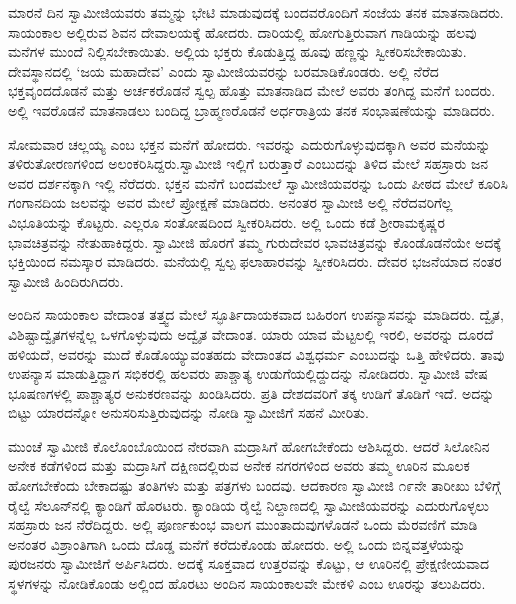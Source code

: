  ಮಾರನೆ ದಿನ ಸ್ವಾಮೀಜಿಯವರು ತಮ್ಮನ್ನು ಭೇಟಿ ಮಾಡುವುದಕ್ಕೆ ಬಂದವರೊಂದಿಗೆ ಸಂಜೆಯ ತನಕ ಮಾತನಾಡಿದರು. ಸಾಯಂಕಾಲ ಅಲ್ಲಿರುವ ಶಿವನ ದೇವಾಲಯಕ್ಕೆ ಹೋದರು. ದಾರಿಯಲ್ಲಿ ಹೋಗುತ್ತಿರುವಾಗ ಗಾಡಿಯನ್ನು ಹಲವು ಮನೆಗಳ ಮುಂದೆ ನಿಲ್ಲಿಸಬೇಕಾಯಿತು. ಅಲ್ಲಿಯ ಭಕ್ತರು ಕೊಡುತ್ತಿದ್ದ ಹೂವು ಹಣ್ಣನ್ನು ಸ್ವೀಕರಿಸಬೇಕಾಯಿತು. ದೇವಸ್ಥಾನದಲ್ಲಿ ‘ಜಯ ಮಹಾದೇವ’ ಎಂದು ಸ್ವಾಮೀಜಿಯವರನ್ನು ಬರಮಾಡಿಕೊಂಡರು. ಅಲ್ಲಿ ನೆರೆದ ಭಕ್ತವೃಂದದೊಡನೆ ಮತ್ತು ಅರ್ಚಕರೊಡನೆ ಸ್ವಲ್ಪ ಹೊತ್ತು ಮಾತನಾಡಿದ ಮೇಲೆ ಅವರು ತಂಗಿದ್ದ ಮನೆಗೆ ಬಂದರು. ಅಲ್ಲಿ ಇವರೊಡನೆ ಮಾತನಾಡಲು ಬಂದಿದ್ದ ಬ್ರಾಹ್ಮಣರೊಡನೆ ಅರ್ಧರಾತ್ರಿಯ ತನಕ ಸಂಭಾಷಣೆಯನ್ನು ಮಾಡಿದರು. 

 ಸೋಮವಾರ ಚಲ್ಲಯ್ಯ ಎಂಬ ಭಕ್ತನ ಮನೆಗೆ ಹೋದರು. ಇವರನ್ನು ಎದುರುಗೊಳ್ಳುವುದಕ್ಕಾಗಿ ಅವರ ಮನೆಯನ್ನು ತಳಿರುತೋರಣಗಳಿಂದ ಅಲಂಕರಿಸಿದ್ದರು.\break ಸ್ವಾಮೀಜಿ ಇಲ್ಲಿಗೆ ಬರುತ್ತಾರೆ ಎಂಬುದನ್ನು ತಿಳಿದ ಮೇಲೆ ಸಹಸ್ರಾರು ಜನ ಅವರ ದರ್ಶನಕ್ಕಾಗಿ ಇಲ್ಲಿ ನೆರೆದರು. ಭಕ್ತನ ಮನೆಗೆ ಬಂದಮೇಲೆ ಸ್ವಾಮೀಜಿಯವರನ್ನು ಒಂದು ಪೀಠದ ಮೇಲೆ ಕೂರಿಸಿ ಗಂಗಾನದಿಯ ಜಲವನ್ನು ಅವರ ಮೇಲೆ ಪ್ರೋಕ್ಷಣೆ ಮಾಡಿದರು. ಅನಂತರ ಸ್ವಾಮೀಜಿ ಅಲ್ಲಿ ನೆರೆದವರಿಗೆಲ್ಲ ವಿಭೂತಿಯನ್ನು ಕೊಟ್ಟರು. ಎಲ್ಲರೂ ಸಂತೋಷದಿಂದ ಸ್ವೀಕರಿಸಿದರು. ಅಲ್ಲಿ ಒಂದು ಕಡೆ ಶ‍್ರೀರಾಮಕೃಷ್ಣರ ಭಾವಚಿತ್ರವನ್ನು ನೇತುಹಾಕಿದ್ದರು. ಸ್ವಾಮೀಜಿ ಹೊರಗೆ ತಮ್ಮ ಗುರುದೇವರ ಭಾವಚಿತ್ರವನ್ನು ಕೊಂಡೊಡನೆಯೇ ಅದಕ್ಕೆ ಭಕ್ತಿಯಿಂದ ನಮಸ್ಕಾರ ಮಾಡಿದರು. ಮನೆಯಲ್ಲಿ ಸ್ವಲ್ಪ ಫಲಾಹಾರವನ್ನು ಸ್ವೀಕರಿಸಿದರು. ದೇವರ ಭಜನೆಯಾದ ನಂತರ ಸ್ವಾಮೀಜಿ ಹಿಂದಿರುಗಿದರು. 

 ಅಂದಿನ ಸಾಯಂಕಾಲ ವೇದಾಂತ ತತ್ತ್ವದ ಮೇಲೆ ಸ್ಫೂರ್ತಿದಾಯಕವಾದ ಬಹಿರಂಗ ಉಪನ್ಯಾಸವನ್ನು ಮಾಡಿದರು. ದ್ವೈತ, ವಿಶಿಷ್ಟಾದ್ವೈತಗಳನ್ನೆಲ್ಲ ಒಳಗೊಳ್ಳುವುದು ಅದ್ವೈತ ವೇದಾಂತ. ಯಾರು ಯಾವ ಮೆಟ್ಟಲಲ್ಲಿ ಇರಲಿ, ಅವರನ್ನು ದೂರದೆ ಹಳಿಯದೆ, ಅವರನ್ನು ಮುದೆ ಕೊಡೊಯ್ಯುವಂತಹದು ವೇದಾಂತದ ವಿಶ್ವಧರ್ಮ ಎಂಬುದನ್ನು ಒತ್ತಿ ಹೇಳಿದರು. ತಾವು ಉಪನ್ಯಾಸ ಮಾಡುತ್ತಿದ್ದಾಗ ಸಭಿಕರಲ್ಲಿ ಹಲವರು ಪಾಶ್ಚಾತ್ಯ ಉಡುಗೆಯಲ್ಲಿದ್ದುದನ್ನು ನೋಡಿದರು. ಸ್ವಾಮೀಜಿ ವೇಷ ಭೂಷಣಗಳಲ್ಲಿ ಪಾಶ್ಚಾತ್ಯರ ಅನುಕರಣವನ್ನು ಖಂಡಿಸಿದರು. ಪ್ರತಿ ದೇಶದವರಿಗೆ ತಕ್ಕ ಉಡಿಗೆ ತೊಡಿಗೆ ಇದೆ. ಅದನ್ನು ಬಿಟ್ಟು ಯಾರದನ್ನೋ ಅನುಸರಿಸುತ್ತಿರುವುದನ್ನು ನೋಡಿ ಸ್ವಾಮೀಜಿಗೆ ಸಹನೆ ಮೀರಿತು. 

 ಮುಂಚೆ ಸ್ವಾಮೀಜಿ ಕೊಲೊಂಬೊಯಿಂದ ನೇರವಾಗಿ ಮದ್ರಾಸಿಗೆ ಹೋಗಬೇಕೆಂದು ಆಶಿಸಿದ್ದರು. ಆದರೆ ಸಿಲೋನಿನ ಅನೇಕ ಕಡೆಗಳಿಂದ ಮತ್ತು ಮದ್ರಾಸಿಗೆ ದಕ್ಷಿಣದಲ್ಲಿರುವ ಅನೇಕ ನಗರಗಳಿಂದ ಅವರು ತಮ್ಮ ಊರಿನ ಮೂಲಕ ಹೋಗಬೇಕೆಂದು ಬೇಕಾದಷ್ಟು ತಂತಿಗಳು ಮತ್ತು ಪತ್ರಗಳು ಬಂದವು. ಆದಕಾರಣ ಸ್ವಾಮೀಜಿ ೧೯ನೇ ತಾರೀಖು ಬೆಳಿಗ್ಗೆ ರೈಲ್ವೆ ಸೆಲೂನ್‍ನಲ್ಲಿ ಕ್ಯಾಂಡಿಗೆ ಹೊರಟರು. ಕ್ಯಾಂಡಿಯ ರೈಲ್ವೆ ನಿಲ್ದಾಣದಲ್ಲಿ ಸ್ವಾಮೀಜಿಯವರನ್ನು ಎದುರುಗೊಳ್ಳಲು ಸಹಸ್ರಾರು ಜನ ನೆರೆದಿದ್ದರು. ಅಲ್ಲಿ ಪೂರ್ಣಕುಂಭ ವಾಲಗ ಮುಂತಾದುವುಗಳೊಡನೆ ಒಂದು ಮೆರವಣಿಗೆ ಮಾಡಿ ಅನಂತರ ವಿಶ್ರಾಂತಿಗಾಗಿ ಒಂದು ದೊಡ್ಡ ಮನೆಗೆ ಕರೆದುಕೊಂಡು ಹೋದರು. ಅಲ್ಲಿ ಒಂದು ಬಿನ್ನವತ್ತಳೆಯನ್ನು ಪುರಜನರು ಸ್ವಾಮೀಜಿಗೆ ಅರ್ಪಿಸಿದರು. ಅದಕ್ಕೆ ಸೂಕ್ತವಾದ ಉತ್ತರವನ್ನು ಕೊಟ್ಟು, ಆ ಊರಿನಲ್ಲಿ ಪ್ರೇಕ್ಷಣೀಯವಾದ ಸ್ಥಳಗಳನ್ನು ನೋಡಿಕೊಂಡು ಅಲ್ಲಿಂದ ಹೊರಟು ಅಂದಿನ ಸಾಯಂಕಾಲವೇ ಮೇಕಳಿ ಎಂಬ ಊರನ್ನು ತಲುಪಿದರು. 

